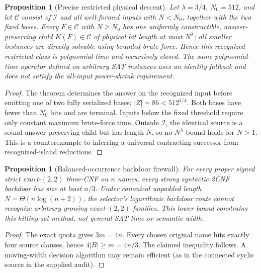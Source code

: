 \documentclass[11pt]{article}
\newtheorem{proposition}[theorem]{Proposition}
\begin{document}
\begin{proposition}[Precise restricted physical descent]
Let $\lambda=3/4$, $N_0=512$, and let $\mathcal C$ consist of $\mathcal I$ and all well-formed inputs with $N<N_0$, together with the two fixed bases. Every $F\in\mathcal C$ with $N\ge N_0$ has one uniformly constructible, answer-preserving child $K(F)\in\mathcal C$ of physical bit length at most $N^\lambda$; all smaller instances are directly solvable using bounded brute force. Hence \emph{this recognized restricted class} is polynomial-time and recursively closed. The same polynomial-time operator defined on arbitrary SAT instances uses an identity fallback and does \emph{not} satisfy the all-input power-shrink requirement.
\end{proposition}
\begin{proof}
The theorem determines the answer on the recognized input before emitting one of two fully serialized bases; $|Z|=86<512^{3/4}$. Both bases have fewer than $N_0$ bits and are terminal. Inputs below the fixed threshold require only constant maximum brute-force time. Outside $\mathcal I$, the identical source is a sound answer-preserving child but has length $N$, so no $N^\lambda$ bound holds for $N>1$. This is a counterexample to inferring a universal contracting successor from recognized-island reductions.
\end{proof}

\begin{proposition}[Balanced-occurrence backdoor firewall]
For every proper signed strict exact-$(2,2)$ three-CNF on $n$ names, every strong syntactic 2CNF backdoor has size at least $n/3$. Under canonical unpadded length $N=\Theta(n\log(n+2))$, the selector's logarithmic backdoor route cannot recognize arbitrary growing exact-$(2,2)$ families. This lower bound constrains this \emph{hitting-set method}, not general SAT time or semantic width.
\end{proposition}
\begin{proof}
The exact quota gives $3m=4n$. Every chosen original name hits exactly four source clauses, hence $4|B|\ge m=4n/3$. The claimed inequality follows. A moving-width decision algorithm may remain efficient (as in the connected cyclic source in the supplied audit).
\end{proof}
\end{document}
